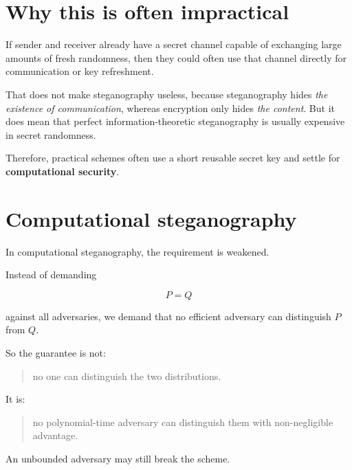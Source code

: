 \documentclass[11pt]{article}
\begin{document}
\section{Why this is often impractical}

If sender and receiver already have a secret channel capable of exchanging large amounts of fresh randomness, then they could often use that channel directly for communication or key refreshment.

\begin{remark}
\label{rem:existence-vs-content}
That does not make steganography useless, because steganography hides \emph{the existence of communication}, whereas encryption only hides \emph{the content}. But it does mean that perfect information-theoretic steganography is usually expensive in secret randomness.
\end{remark}

Therefore, practical schemes often use a short reusable secret key and settle for \textbf{computational security}.

\section{Computational steganography}

\begin{definition}
\label{def:computational-steganography}
In computational steganography, the requirement is weakened.

Instead of demanding

\[
P=Q
\]

against all adversaries, we demand that no efficient adversary can distinguish $P$ from $Q$.
\end{definition}

So the guarantee is not:

\begin{quote}
no one can distinguish the two distributions.
\end{quote}

It is:

\begin{quote}
no polynomial-time adversary can distinguish them with non-negligible advantage.
\end{quote}

\begin{callout}[warning]
\label{co:unbounded-adversary}
An unbounded adversary may still break the scheme.
\end{callout}
\end{document}
